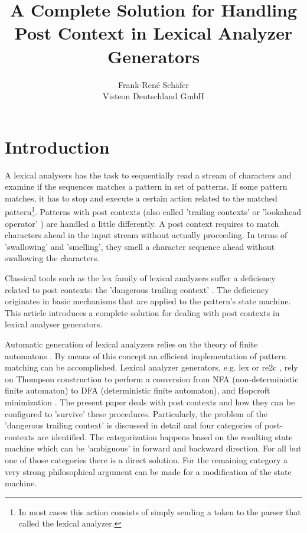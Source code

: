 \documentclass[acmtoplas]{acmtrans2m}
\title{A Complete Solution for Handling Post Context in Lexical Analyzer Generators}
\author{Frank-Ren\'e Sch\"afer   \\
        Visteon Deutschland GmbH}
\begin{document}

\maketitle

\section{Introduction}

A lexical analysers has the task to sequentially read a stream of
characters and examine if the sequences matches a pattern in set of patterns.
If some pattern matches, it has to stop and execute a certain action
related to the matched pattern\footnote{In most cases this action consists of simply
sending a token to the parser that called the lexical analyzer.}.
Patterns with post contexts (also called 'trailing contexts' \cite{} or
'lookahead operator' \cite{Aho:2007}) are handled a
little differently. A post context requires to match characters ahead in the input stream without
actually proceeding. In terms of 'swallowing' and 'smelling', they smell a
character sequence ahead without swallowing the characters.

Classical tools such as the lex family of lexical analyzers\cite{Lesk:1975}
suffer a deficiency related to post contexts: the 'dangerous trailing context'
\cite{Paxson:1995}. The deficiency originates in basic mechanisms that are
applied to the pattern's state machine. This article introduces a complete
solution for dealing with post contexts in lexical analyser generators.

Automatic generation of lexical analyzers relies on the theory of finite
automatons \cite{Hopcroft:2006}. By means of this concept an efficient
implementation of pattern matching can be accomplished. Lexical analyzer
generators, e.g. lex or re2c \cite{Bumbulis:1993}, rely on Thompson
construction \cite{Thompson:1968}
to perform a conversion from NFA (non-deterministic finite automaton) to DFA
(deterministic finite automaton), and Hopcroft minimization
\cite{Hopcroft:1971}. The present paper deals with post contexts and how they
can be configured to 'survive' these procedures. Particularly, the problem of
the 'dangerous trailing context' is discussed in detail and four categories of
post-contexts are identified. The categorization happens based on the resulting
state machine which can be 'ambiguous' in forward and backward direction. For all
but one of those categories there is a direct solution. For the remaining
category a very strong philosophical argument can be made for a modification of
the state machine.
\end{document}
